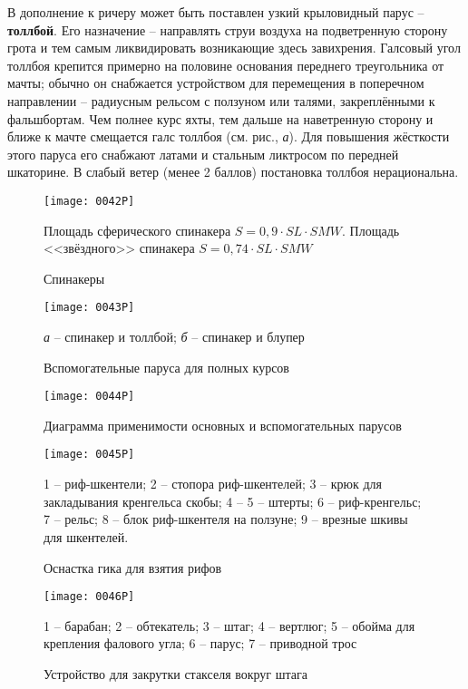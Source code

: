 В дополнение к ричеру может быть поставлен узкий крыловидный парус
\--- \textbf{толлбой}. Его
назначение \--- направлять струи воздуха на подветренную сторону грота
и тем самым ликвидировать возникающие здесь завихрения. Галсовый угол
толлбоя крепится примерно на половине основания переднего треугольника
от мачты; обычно он снабжается устройством для перемещения в
поперечном направлении \--- радиусным рельсом с ползуном или талями,
закреплёнными к фальшбортам. Чем полнее курс яхты, тем дальше на
наветренную сторону и ближе к мачте смещается галс толлбоя
(см. рис., \textit{а}). Для повышения жёсткости этого паруса
его снабжают латами и стальным ликтросом по передней шкаторине. В
слабый ветер (менее 2 баллов) постановка толлбоя нерациональна.

\begin{figure}[htb]
  \centering{}
  \texttt{[image: 0042P]}
  \caption{Спинакеры}
  \label{fig:42}
  \small
  \centering{}
  Площадь сферического спинакера $S = 0,9 \cdot SL \cdot SMW$. Площадь <<звёздного>> спинакера $ S = 0,74 \cdot SL \cdot SMW$
\end{figure}

\begin{figure*}[htb]
  \centering{}
  \texttt{[image: 0043P]}
  \caption{Вспомогательные паруса для полных курсов}
  \label{fig:43}
  \small
  \centering{}
  \textit{а} \--- спинакер и толлбой; \textit{б} \--- спинакер и блупер
\end{figure*}

\begin{figure}[htb]
  \centering{}
  \texttt{[image: 0044P]}
  \caption{Диаграмма применимости основных и вспомогательных парусов}
  \label{fig:44}
\end{figure}

\begin{figure*}[htb]
  \centering{}
  \texttt{[image: 0045P]}
  \caption{Оснастка гика для взятия рифов}
  \label{fig:45}
  \small
  1 \--- риф-шкентели; 2 \---  стопора риф-шкентелей; 3 \--- крюк для закладывания кренгельса скобы; 4 \--- 5 \--- штерты; 6 \--- риф-кренгельс; 7 \--- рельс; 8 \--- блок риф-шкентеля на ползуне; 9 \--- врезные шкивы для шкентелей. 
\end{figure*}

\begin{figure}[htb]
  \centering{}
  \texttt{[image: 0046P]}
  \caption{Устройство для закрутки стакселя вокруг штага}
  \label{fig:46}
  \small
  1 \--- барабан; 2 \--- обтекатель; 3 \--- штаг; 4 \--- вертлюг; 5 \--- обойма для крепления фалового угла; 6 \--- парус; 7 \--- приводной трос
\end{figure}

